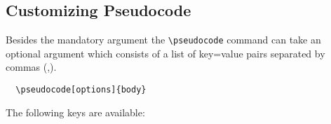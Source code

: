 \documentclass[a4paper]{report}
\begin{document}
  
  \subsection{Customizing Pseudocode}
  
  Besides the mandatory argument the \lstinline{\pseudocode} command can take an optional argument which consists of a list of key=value pairs
  separated by commas (,).
  \begin{lstlisting}
  \pseudocode[options]{body}
  \end{lstlisting}
  The following keys are available:
\end{document}
